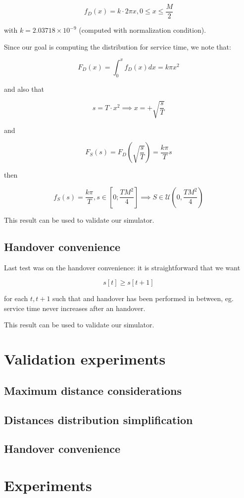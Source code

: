 \documentclass[a4paper,12pt]{article}
\begin{document}
$$ f_D(x) = k \cdot 2 \pi x, 0 \leq x \leq \frac{M}{2} $$

with $k = 2.03718 \times 10^{-9}$ (computed with normalization condition).

Since our goal is computing the distribution for service time, we note that:

$$ F_D(x) = \int_{0}^{x} f_D(x) dx = k \pi x^2 $$

and also that

$$ s = T \cdot x^2 \implies x = + \sqrt{\frac{s}{T}} $$

and

$$ F_S(s) = F_D\left(\sqrt{\frac{s}{T}}\right) = \frac{k \pi}{T} s $$

then

$$ f_S(s) = \frac{k \pi}{T}, s \in \left[0; \frac{TM^2}{4}\right] \implies S \in \mathcal{U}\left(0, \frac{TM^2}{4} \right)$$

This result can be used to validate our simulator.

\subsection{Handover convenience}
Last test was on the handover convenience: it is straightforward that we want

$$ s[t] \geq s[t + 1] $$

for each $t, t + 1$ such that and handover has been performed in between, eg. service time never increases after an handover.

This result can be used to validate our simulator.

\section{Validation experiments}
\subsection{Maximum distance considerations}
\subsection{Distances distribution simplification}
\subsection{Handover convenience}









\section{Experiments}
\end{document}
